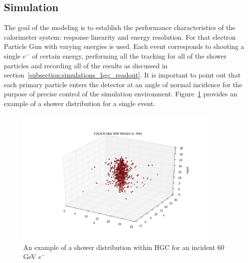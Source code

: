 \subsection{Simulation}
The goal of the modeling is to establish the performance characteristics of the calorimeter system: response linearity and energy resolution. For that electron Particle Gun with varying energies is used. Each event corresponds to shooting a single $e^-$ of certain energy, performing all the tracking for all of the shower particles and recording all of the results as discussed in section~\ref{subsection:simulations_hgc_readout}. It is important to point out that each primary particle enters the detector at an angle of normal incidence for the purpose of precise control of the simulation environment. Figure~\ref{fig:simulations_hgc_scatter60} provides an example of a shower distribution for a single event.
\begin{figure}[htbp]
    \centering
    \includegraphics[width=0.9\textwidth]{figures/ch_simulations/hgc/scatter_3d/scatter_3D_60GeV.png}
    \caption{An example of a shower distribution within {\sc HGC} for an incident 60 GeV $e^-$}
    \label{fig:simulations_hgc_scatter60}
 \end{figure}

